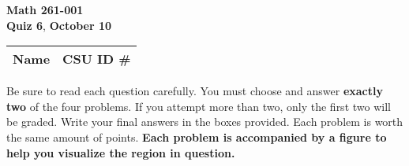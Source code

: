 \documentclass[12pt]{exam}
\newcommand{\class}{Math 261-001} %
\newcommand{\examnum}{Quiz 6} %
\newcommand{\examdate}{October 10} %
\begin{document}
\pagestyle{plain}
\thispagestyle{empty}

\noindent
\textbf{\class}\\
\textbf{\examnum}, \textbf{\examdate} \\



\setlength{\tabcolsep}{3.5cm} %
\renewcommand{\arraystretch}{1.5}
\setlength\extrarowheight{1cm}
\begin{tabular}{ |c|c| } 
 \hline
 Name   & CSU ID \#  \\ 
 \hline
\end{tabular}
\vspace{10pt}
\iffalse

    \foreach \s in {1,...,5}{
          \choice $P_\s$ has no power 
     }%
\fi

Be sure to read each question carefully. You must choose and answer \textbf{exactly two} of the four problems.  
If you attempt more than two, only the first two will be graded.  
Write your final answers in the boxes provided. Each problem is worth the same amount of points.  
\textbf{Each problem is accompanied by a figure to help you visualize the region in question.}  
\end{document}
